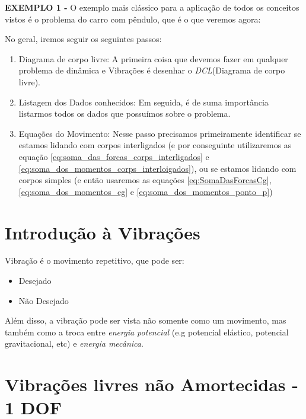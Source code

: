 \documentclass{article}
\begin{document}
\textbf{EXEMPLO 1 - } O exemplo mais clássico para a aplicação de todos os conceitos vistos é o problema do carro com pêndulo, que é o que veremos agora:


No geral, iremos seguir os seguintes passos:
\begin{enumerate}
    \item Diagrama de corpo livre: A primeira coisa que devemos fazer em qualquer problema de dinâmica e Vibrações é desenhar o \emph{DCL}(Diagrama de corpo livre).
    \item Listagem dos Dados conhecidos: Em seguida, é de suma importância listarmos todos os dados que possuímos sobre o problema.
    \item Equações do Movimento: Nesse passo precisamos primeiramente identificar se estamos lidando com corpos interligados (e por conseguinte utilizaremos as equação
          \ref{eq:soma_das_forcas_corps_interligados} e \ref{eq:soma_dos_momentos_corps_interloigados}), ou se estamos lidando com corpos simples (e então usaremos as equações
          \ref{eq:SomaDasForcasCg}, \ref{eq:soma_dos_momentos_cg} e \ref{eq:soma_dos_momentos_ponto_p})
\end{enumerate}



\section{Introdução à Vibrações}

Vibração é o movimento repetitivo, que pode ser:
\begin{itemize}
    \item Desejado
    \item Não Desejado
\end{itemize}

Além disso, a vibração pode ser vista não somente como um movimento, mas também como a troca entre \emph{energia potencial} (e.g potencial elástico, potencial gravitacional, etc) e
\emph{energia mecânica}.

\section{Vibrações livres não Amortecidas - 1 DOF}
\end{document}
